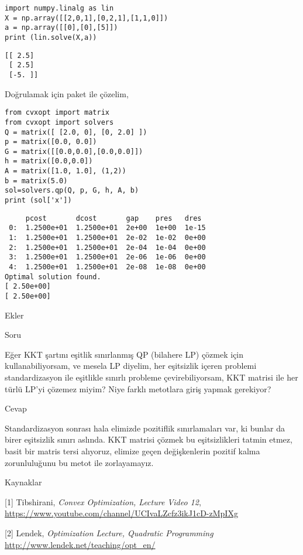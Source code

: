 \documentclass[12pt,fleqn]{article}\usepackage{../../common}
\begin{document}
\begin{verbatim}
import numpy.linalg as lin
X = np.array([[2,0,1],[0,2,1],[1,1,0]]) 
a = np.array([[0],[0],[5]])
print (lin.solve(X,a))
\end{verbatim}

\begin{verbatim}
[[ 2.5]
 [ 2.5]
 [-5. ]]
\end{verbatim}

Doğrulamak için paket ile çözelim,

\begin{verbatim}
from cvxopt import matrix
from cvxopt import solvers
Q = matrix([ [2.0, 0], [0, 2.0] ])
p = matrix([0.0, 0.0])
G = matrix([[0.0,0.0],[0.0,0.0]])
h = matrix([0.0,0.0])
A = matrix([1.0, 1.0], (1,2))
b = matrix(5.0)
sol=solvers.qp(Q, p, G, h, A, b)
print (sol['x'])
\end{verbatim}

\begin{verbatim}
     pcost       dcost       gap    pres   dres
 0:  1.2500e+01  1.2500e+01  2e+00  1e+00  1e-15
 1:  1.2500e+01  1.2500e+01  2e-02  1e-02  0e+00
 2:  1.2500e+01  1.2500e+01  2e-04  1e-04  0e+00
 3:  1.2500e+01  1.2500e+01  2e-06  1e-06  0e+00
 4:  1.2500e+01  1.2500e+01  2e-08  1e-08  0e+00
Optimal solution found.
[ 2.50e+00]
[ 2.50e+00]
\end{verbatim}

Ekler

Soru

Eğer KKT şartını eşitlik sınırlanmış QP (bilahere LP) çözmek için
kullanabiliyorsam, ve mesela LP diyelim, her eşitsizlik içeren problemi
standardizasyon ile eşitlikle sınırlı probleme çevirebiliyorsam, KKT
matrisi ile her türlü LP'yi çözemez miyim? Niye farklı metotlara giriş
yapmak gerekiyor? 

Cevap

Standardizasyon sonrası hala elimizde pozitiflik sınırlamaları var, ki
bunlar da birer eşitsizlik sınırı aslında. KKT matrisi çözmek bu
eşitsizlikleri tatmin etmez, basit bir matris tersi alıyoruz, elimize geçen
değişkenlerin pozitif kalma zorunluluğunu bu metot ile zorlayamayız.

Kaynaklar

[1] Tibshirani, {\em Convex Optimization, Lecture Video 12}, 
\url{https://www.youtube.com/channel/UCIvaLZcfz3ikJ1cD-zMpIXg}   

[2] Lendek, {\em Optimization Lecture, Quadratic Programming}
\url{http://www.lendek.net/teaching/opt_en/}
\end{document}
